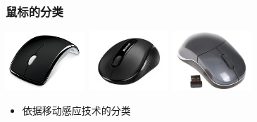 \documentclass{beamer}
\begin{document}
\begin{frame}
	\frametitle{鼠标的分类}
	\beamertemplatetransparentcovereddynamicmedium
	\begin{center}
	\includegraphics[width=3cm]{images/mouse1.jpg}
	\includegraphics[width=3cm]{images/mouse2.jpg}
	\includegraphics[width=3cm]{images/mouse3.jpg}
	\end{center}
	\begin{itemize}
		\item 依据移动感应技术的分类
		\begin{itemize}
		\end{itemize}
	\end{itemize}
\end{frame}
\end{document}
